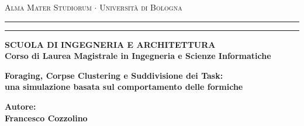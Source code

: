 \documentclass[12pt,a4paper]{report}
\begin{document}
\begin{titlepage}
\begin{center}
{{\Large{\textsc{Alma Mater Studiorum $\cdot$ Universit\`a di
Bologna}}}} \rule[0.1cm]{15.8cm}{0.1mm}
\rule[0.5cm]{15.8cm}{0.6mm}
{\small{\bf SCUOLA DI INGEGNERIA E ARCHITETTURA\\
Corso di Laurea Magistrale in Ingegneria e Scienze Informatiche }}
\end{center}
\vspace{15mm}
\begin{center}
{\LARGE{\bf Foraging, Corpse Clustering e Suddivisione dei Task: \\ \vspace{3 mm} una simulazione basata sul comportamento delle formiche}
}
\end{center}


\vspace{10mm}

\vspace{40mm}
\par
\noindent

\hfill
\begin{minipage}[t]{0.47\textwidth}\raggedleft
{\large{\bf Autore:\\
Francesco Cozzolino}}
\end{minipage}
\vspace{20mm}
\end{titlepage}

\newpage
\thispagestyle{empty}
\mbox{}
\end{document}
